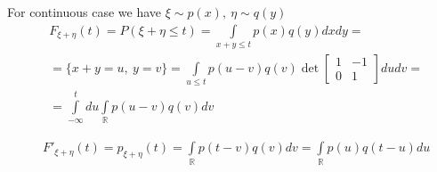 \documentclass[fullscreen=true, bookmarks=true, hyperref={pdfencoding=unicode}]{beamer}
\begin{document}
\begin{frame}
  For continuous case we have $\xi \sim p(x),\ \eta \sim q(y)$
  \begin{align*}
    &F_{\xi+\eta}(t) = P(\xi+\eta \leq t) = \int\limits_{x+y \leq t} p(x)q(y)dxdy = \\
    &= \{x+y = u,\ y = v\} = \int\limits_{u \leq t} p(u-v)q(v)
    \det \begin{bmatrix}
      1 & -1 \\
      0 & 1
    \end{bmatrix} dudv = \\
    &= \int\limits_{-\infty}^t du \int\limits_{\mathbb{R}} p(u-v)q(v) dv 
  \end{align*}

  \begin{align*}
    &F'_{\xi+\eta}(t) = p_{\xi+\eta}(t) = \int\limits_{\mathbb{R}} p(t-v)q(v)dv
    = \int\limits_{\mathbb{R}} p(u)q(t-u)du
  \end{align*}

\end{frame}
\end{document}
